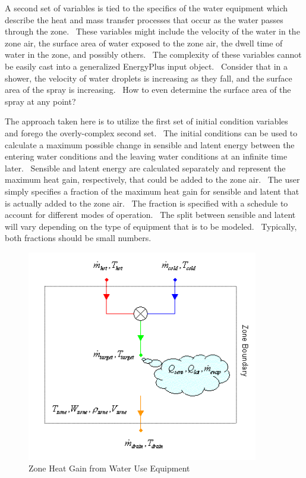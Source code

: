 A second set of variables is tied to the specifics of the water equipment which describe the heat and mass transfer processes that occur as the water passes through the zone.~ These variables might include the velocity of the water in the zone air, the surface area of water exposed to the zone air, the dwell time of water in the zone, and possibly others.~ The complexity of these variables cannot be easily cast into a generalized EnergyPlus input object.~ Consider that in a shower, the velocity of water droplets is increasing as they fall, and the surface area of the spray is increasing.~ How to even determine the surface area of the spray at any point?

The approach taken here is to utilize the first set of initial condition variables and forego the overly-complex second set.~ The initial conditions can be used to calculate a maximum possible change in sensible and latent energy between the entering water conditions and the leaving water conditions at an infinite time later.~ Sensible and latent energy are calculated separately and represent the maximum heat gain, respectively, that could be added to the zone air.~ The user simply specifies a fraction of the maximum heat gain for sensible and latent that is actually added to the zone air.~ The fraction is specified with a schedule to account for different modes of operation.~ The split between sensible and latent will vary depending on the type of equipment that is to be modeled.~ Typically, both fractions should be small numbers.

\begin{figure}[hbtp] %
\centering
\includegraphics[width=0.9\textwidth, height=0.9\textheight, keepaspectratio=true]{media/image6962.png}
\caption{Zone Heat Gain from Water Use Equipment \protect \label{fig:zone-heat-gain-from-water-use-equipment}}
\end{figure}

